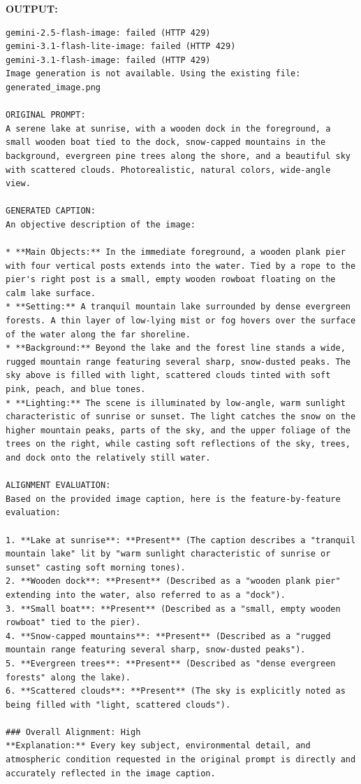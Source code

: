 \documentclass[10pt,a4paper]{article}
\newcommand{\sectionlabel}[1]{\par\vspace{3pt}\noindent\textbf{#1}\par\nopagebreak}
\begin{document}
\sectionlabel{OUTPUT:}
\begin{lstlisting}[style=output]
gemini-2.5-flash-image: failed (HTTP 429)
gemini-3.1-flash-lite-image: failed (HTTP 429)
gemini-3.1-flash-image: failed (HTTP 429)
Image generation is not available. Using the existing file: generated_image.png

ORIGINAL PROMPT:
A serene lake at sunrise, with a wooden dock in the foreground, a small wooden boat tied to the dock, snow-capped mountains in the background, evergreen pine trees along the shore, and a beautiful sky with scattered clouds. Photorealistic, natural colors, wide-angle view.

GENERATED CAPTION:
An objective description of the image:

* **Main Objects:** In the immediate foreground, a wooden plank pier with four vertical posts extends into the water. Tied by a rope to the pier's right post is a small, empty wooden rowboat floating on the calm lake surface.
* **Setting:** A tranquil mountain lake surrounded by dense evergreen forests. A thin layer of low-lying mist or fog hovers over the surface of the water along the far shoreline.
* **Background:** Beyond the lake and the forest line stands a wide, rugged mountain range featuring several sharp, snow-dusted peaks. The sky above is filled with light, scattered clouds tinted with soft pink, peach, and blue tones.
* **Lighting:** The scene is illuminated by low-angle, warm sunlight characteristic of sunrise or sunset. The light catches the snow on the higher mountain peaks, parts of the sky, and the upper foliage of the trees on the right, while casting soft reflections of the sky, trees, and dock onto the relatively still water.

ALIGNMENT EVALUATION:
Based on the provided image caption, here is the feature-by-feature evaluation:

1. **Lake at sunrise**: **Present** (The caption describes a "tranquil mountain lake" lit by "warm sunlight characteristic of sunrise or sunset" casting soft morning tones).
2. **Wooden dock**: **Present** (Described as a "wooden plank pier" extending into the water, also referred to as a "dock").
3. **Small boat**: **Present** (Described as a "small, empty wooden rowboat" tied to the pier).
4. **Snow-capped mountains**: **Present** (Described as a "rugged mountain range featuring several sharp, snow-dusted peaks").
5. **Evergreen trees**: **Present** (Described as "dense evergreen forests" along the lake).
6. **Scattered clouds**: **Present** (The sky is explicitly noted as being filled with "light, scattered clouds").

### Overall Alignment: High
**Explanation:** Every key subject, environmental detail, and atmospheric condition requested in the original prompt is directly and accurately reflected in the image caption.
\end{lstlisting}
\end{document}

